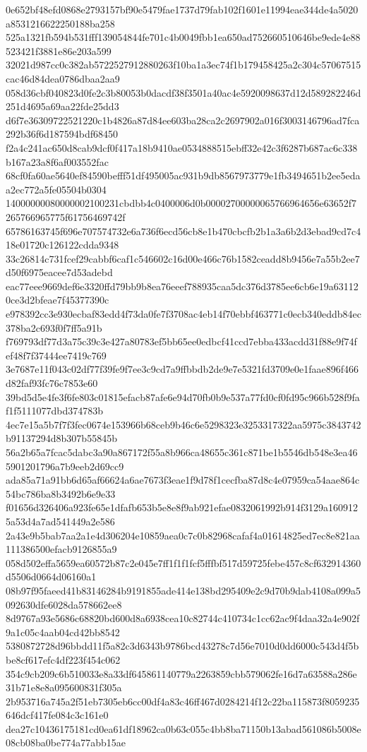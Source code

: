 {0e652bf48efd0868e2793157bf90e5479fae1737d79fab102f1601e11994eae344de4a5020a8531216622250188ba258
525a1321fb594b531fff139054844fe701c4b0049fbb1ea650ad752660510646be9ede4e88523421f3881e86e203a599
32021d987cc0c382ab5722527912880263f10ba1a3ec74f1b179458425a2c304c57067515cac46d84dea0786dbaa2aa9
058d36cbf040823d0fe2c3b80053b0dacdf38f3501a40ac4e5920098637d12d589282246d251d4695a69aa22fde25dd3
d6f7e36309722521220c1b4826a87d84ee603ba28ca2c2697902a016f3003146796ad7fca292b36f6d187594bdf68450
f2a4c241ac650d8cab9dcf0f417a18b9410ae0534888515ebff32e42c3f6287b687ac6c338b167a23a8f6af003552fac
68cf0fa60ae5640ef84590befff51df495005ac931b9db8567973779e1fb3494651b2ee5edaa2ec772a5fe05504b0304
14000000080000002100231cbdbb4c0400006d0b00002700000065766964656e63652f7265766965775f61756469742f
65786163745f696e707574732e6a736f6ecd56cb8e1b470cbcfb2b1a3a6b2d3ebad9cd7c418e01720c126122cdda9348
33c26814c731fcef29cabbf6caf1c546602c16d00e466c76b1582ceadd8b9456e7a55b2ee7d50f6975eacee7d53adebd
eac77eee9669def6e3320ffd79bb9b8ea76eeef788935caa5dc376d3785ee6cb6e19a631120ce3d2bfeae7f45377390c
e978392cc3e930ecbaf83edd4f73da0fe7f3708ac4eb14f70ebbf463771c0ecb340eddb84ec378ba2c693f0f7ff5a91b
f769793df77d3a75c39c3e427a80783ef5bb65ee0edbcf41ccd7ebba433acdd31f88e9f74fef48f7f37444ee7419c769
3e7687e11f043c02df77f39fe9f7ee3c9cd7a9ffbbdb2de9e7e5321fd3709e0e1faae896f466d82faf93fc76c7853e60
39bd5d5e4fe3f6fe803c01815efacb87afe6e94d70fb0b9e537a77fd0cf0fd95c966b528f9faf1f5111077dbd374783b
4ec7e15a5b7f7f3fec0674e153966b68ceb9b46c6e5298323e3253317322aa5975c3843742b91137294d8b307b55845b
56a2b65a7fcac5dabc3a90a867172f55a8b966ca48655c361c871be1b5546db548e3ea465901201796a7b9eeb2d69cc9
ada85a71a91bb6d65af66624a6ae7673f3eae1f9d78f1cecfba87d8c4e07959ca54aae864c54bc786ba8b3492b6e9e33
f01656d326406a923fe65e1dfafb653b5e8e8f9ab921efae0832061992b914f3129a1609125a53d4a7ad541449a2e586
2a43e9b5bab7aa2a1e4d306204e10859aea0c7c0b82968cafaf4a01614825ed7ec8e821aa111386500efacb9126855a9
058d502effa5659ea60572b87c2e045e7ff1f1f1fcf5fffbf517d59725febe457c8cf632914360d5506d0664d06160a1
08b97f95faeed41b83146284b9191855ade414e138bd295409e2c9d70b9dab4108a099a5092630dfe6028da578662ee8
8d9767a93e5686c68820bd600d8a6938cea10c82744c410734c1cc62ac9f4daa32a4e902f9a1c05c4aab04cd42bb8542
5380872728d96bbdd11f5a82c3d6343b9786bcd43278c7d56e7010d0dd6000c543d4f5bbe8cf617efc4df223f454c062
354c9cb209c6b510033e8a33df645861140779a2263859cbb579062fe16d7a63588a286e31b71e8e8a095600831f305a
2b953716a745a2f51eb7305eb6cc00df4a83c46ff467d0284214f12c22ba115873f8059235646dcf417fe084c3c161e0
dea27c10436175181cd0ea61df18962ca0b63c055c4bb8ba71150b13abad561086b5008e08cb08ba0be774a77abb15ae
}
